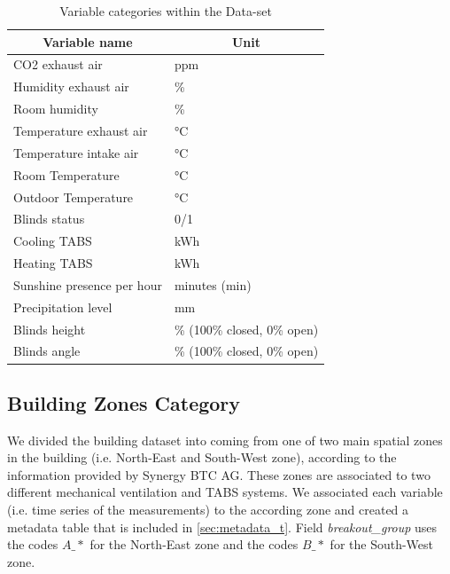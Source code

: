 \begin{table}[htbp]
  \centering
  \scriptsize
  \caption{Variable categories within the Data-set}
    \begin{tabular}{|l|l|}
    \hline
    \multicolumn{1}{|c|}{\textbf{Variable name}} & \multicolumn{1}{c|}{\textbf{Unit}} \bigstrut\\
    \hline
    CO2 exhaust air & ppm \bigstrut\\
    \hline
    Humidity exhaust air & \% \bigstrut\\
    \hline
    Room humidity & \% \bigstrut\\
    \hline
    Temperature exhaust air & °C \bigstrut\\
    \hline
    Temperature intake air & °C \bigstrut\\
    \hline
    Room Temperature & °C \bigstrut\\
    \hline
    Outdoor Temperature & °C \bigstrut\\
    \hline
    Blinds status & 0/1 \bigstrut\\
    \hline
    Cooling TABS & kWh \bigstrut\\
    \hline
    Heating TABS & kWh \bigstrut\\
    \hline
    Sunshine presence per hour & minutes (min) \bigstrut\\
    \hline
    Precipitation level & mm \bigstrut\\
    \hline
    Blinds height & \% (100\% closed, 0\% open) \bigstrut\\
    \hline
    Blinds angle & \% (100\% closed, 0\% open) \bigstrut\\
    \hline
    \end{tabular}%
  \label{tab:variable_sum}%
\end{table}%



\subsection{Building Zones Category}
We divided the building dataset into coming from one of two main spatial zones in the building (i.e. North-East and South-West zone), according to the information provided by Synergy BTC AG. These zones are associated to two different mechanical ventilation and TABS systems. We associated each variable (i.e. time series of the measurements) to the according zone and created a metadata table that is included in \ref{sec:metadata_t}. Field \textit{breakout\_group} uses the codes $A\_\ast$ for the North-East zone and the codes $B\_\ast$ for the South-West zone. 
  
